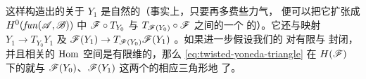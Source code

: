 这样构造出的\trIsomorphism{}关于 $Y_1$ 是自然的（事实上，只要再多费些力气，
便可以把它扩张成\trFunctor\trCategory{} $H^0(\mathit{fun}(\mathscr{A},\mathscr{B}))$ 中
$\mathscr{F}\circ T_{Y_0}$ 与 $T_{\mathscr{F}(Y_0)}\circ\mathscr{F}$ 之间的一个%
\trCanonical{}的\trIsomorphism）。它还与\trCanonical{}映射
$Y_1\to T_{Y_0}Y_1$ 及 $\mathscr{F}(Y_1)\to T_{\mathscr{F}(Y_0)}\mathscr{F}(Y_1)$
\trCompatible。如果进一步假设我们的 \trACategory{}对有限\trDirectSum{}与%
\trSuspension{}封闭，并且相关的 $\operatorname{Hom}$ 空间是有限维的，那么\trExactTriangle
\eqref{eq:twisted-yoneda-triangle} 在 $H(\mathscr{F})$ 下的\trImage{}就与
$\mathscr{F}(Y_0)$、$\mathscr{F}(Y_1)$ 这两个\trObject{}的相应三角形\trCanonical{}地%
\trIsomorphic{}了。
